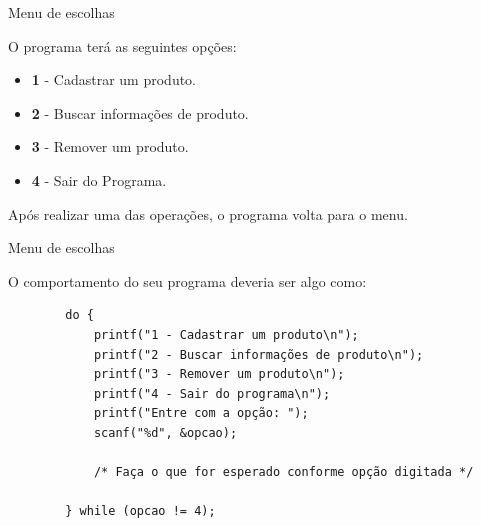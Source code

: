 \documentclass[handout]{beamer}
\begin{document}
\begin{frame}[fragile]{Menu de escolhas}

    O programa terá as seguintes opções:
    \begin{itemize}
        \item {\bf 1} - Cadastrar um produto.
        \item {\bf 2} - Buscar informações de produto.
        \item {\bf 3} - Remover um produto.
        \item {\bf 4} - Sair do Programa.
    \end{itemize}

    Após realizar uma das operações, o programa volta para o menu.
\end{frame}

\begin{frame}[fragile]{Menu de escolhas}

    O comportamento do seu programa deveria ser algo como:

    \begin{verbatim}
        do {
            printf("1 - Cadastrar um produto\n");
            printf("2 - Buscar informações de produto\n");
            printf("3 - Remover um produto\n");
            printf("4 - Sair do programa\n");
            printf("Entre com a opção: ");
            scanf("%d", &opcao);

            /* Faça o que for esperado conforme opção digitada */

        } while (opcao != 4);
    \end{verbatim}
\end{frame}
\end{document}

